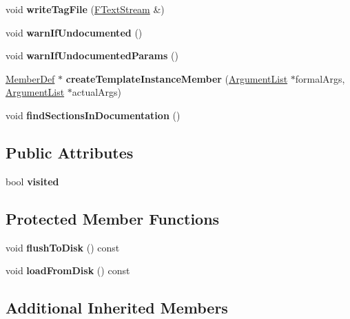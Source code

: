 \begin{DoxyCompactItemize}
void {\bfseries write\+Tag\+File} (\mbox{\hyperlink{class_f_text_stream}{F\+Text\+Stream}} \&)
\item 
\mbox{\label{class_member_def_abc7ce1039808b770b1a283cc2aafb713}} 
void {\bfseries warn\+If\+Undocumented} ()
\item 
\mbox{\label{class_member_def_a257ec9247901dbab194a8930c39acbe9}} 
void {\bfseries warn\+If\+Undocumented\+Params} ()
\item 
\mbox{\label{class_member_def_a89bb4168f71a20ce3c80cbe086b9115c}} 
\mbox{\hyperlink{class_member_def}{Member\+Def}} $\ast$ {\bfseries create\+Template\+Instance\+Member} (\mbox{\hyperlink{class_argument_list}{Argument\+List}} $\ast$formal\+Args, \mbox{\hyperlink{class_argument_list}{Argument\+List}} $\ast$actual\+Args)
\item 
\mbox{\label{class_member_def_a39101ee7126058a7923d89ae02a10ff0}} 
void {\bfseries find\+Sections\+In\+Documentation} ()
\end{DoxyCompactItemize}
\subsection*{Public Attributes}
\begin{DoxyCompactItemize}
\item 
\mbox{\label{class_member_def_ac5036da555a368084602330c51727cec}} 
bool {\bfseries visited}
\end{DoxyCompactItemize}
\subsection*{Protected Member Functions}
\begin{DoxyCompactItemize}
\item 
\mbox{\label{class_member_def_a91ea65ffa3d877278d97659fe16a62f5}} 
void {\bfseries flush\+To\+Disk} () const
\item 
\mbox{\label{class_member_def_aa6ac63f3563437099c44410c2031bba8}} 
void {\bfseries load\+From\+Disk} () const
\end{DoxyCompactItemize}
\subsection*{Additional Inherited Members}


